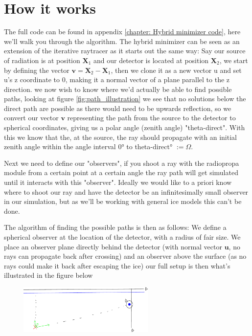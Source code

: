 \documentclass[11pt,a4paper,faculty=we,language=en,doctype=report]{cls/ugent-doc}
\begin{document}
\section{How it works}
The full code can be found in appendix \ref{chapter: Hybrid minimizer code},
here we'll walk you through the algorithm.  The hybrid minimizer can be seen as
an extension of the iterative raytracer \cite{2022icrc.confE1027O} as it starts
out the same way: Say our source of radiation is at position $\mathbf{X}_1$ and
our detector is located at position $\mathbf{X}_2$, we start by defining the
vector $\mathbf{v} = \mathbf{X}_2 - \mathbf{X}_1$, then we clone it as a new
vector u and set u's z coordinate to 0, making it a normal vector of a plane
parallel to the z direction. we now wish to know where we'd actually be able to
find possible paths, looking at figure \ref{fig:path_illustration} we see that
no solutions below the direct path are possible as there would need to be
upwards reflection, so we convert our vector $\mathbf{v}$ representing the path
from the source to the detector to spherical coordinates, giving us a polar
angle (zenith angle) "theta-direct". With this we know that the, at the source,
the ray should propagate with an initial zenith angle within the angle interval
0° to theta-direct° $:= \Omega$.

Next we need to define our "observers", if you shoot a ray with the radiopropa module from a certain
point at a certain angle the ray path will get simulated until it interacts with this "observer".
Ideally we would like to a priori know where to shoot our ray and have the detector be an infinitesimally small
observer in our simulation, but as we'll be working with general ice models this can't be done.

The algorithm of finding the possible paths is then as follows:
We define a spherical observer at the location of the detector, with a radius of fair size. We place an 
observer plane directly behind the detector (with normal vector $\mathbf{u}$, no rays can propagate back after crossing) 
and an observer above the surface (as no rays could make it back after escaping the ice) our 
full setup is then what's illustrated in the figure below
\begin{figure}[h!]
  \centering
  \includegraphics[width=0.6\textwidth]{algoillu.pdf}
\end{figure}\\
\end{document}
